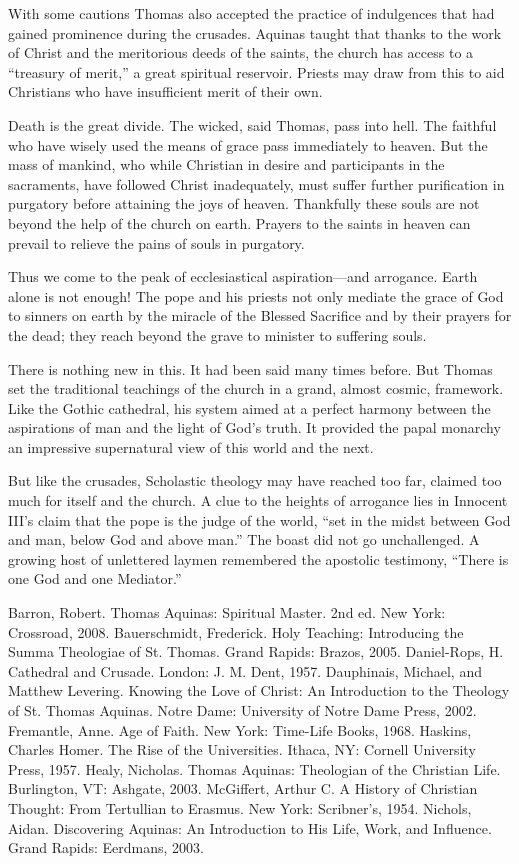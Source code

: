 With some cautions Thomas also accepted the practice of indulgences that had gained prominence
during the crusades. Aquinas taught that thanks to the work of Christ and the meritorious deeds of
the saints, the church has access to a “treasury of merit,” a great spiritual reservoir. Priests may
draw from this to aid Christians who have insufficient merit of their own.

Death is the great divide. The wicked, said Thomas, pass into hell. The faithful who have wisely
used the means of grace pass immediately to heaven. But the mass of mankind, who while Christian in
desire and participants in the sacraments, have followed Christ inadequately, must suffer further
purification in purgatory before attaining the joys of heaven. Thankfully these souls are not beyond
the help of the church on earth. Prayers to the saints in heaven can prevail to relieve the pains of
souls in purgatory.

Thus we come to the peak of ecclesiastical aspiration—and arrogance. Earth alone is not enough! The
pope and his priests not only mediate the grace of God to sinners on earth by the miracle of the
Blessed Sacrifice and by their prayers for the dead; they reach beyond the grave to minister to
suffering souls.

There is nothing new in this. It had been said many times before. But Thomas set the traditional
teachings of the church in a grand, almost cosmic, framework. Like the Gothic cathedral, his system
aimed at a perfect harmony between the aspirations of man and the light of God’s truth. It provided
the papal monarchy an impressive supernatural view of this world and the next.

But like the crusades, Scholastic theology may have reached too far, claimed too much for itself and
the church. A clue to the heights of arrogance lies in Innocent III’s claim that the pope is the
judge of the world, “set in the midst between God and man, below God and above man.” The boast did
not go unchallenged. A growing host of unlettered laymen remembered the apostolic testimony, “There
is one God and one Mediator.”

\begin{readinglist}
\entry *Barron, Robert. Thomas Aquinas: Spiritual Master. 2nd ed. New York: Crossroad, 2008.
\entry *Bauerschmidt, Frederick. Holy Teaching: Introducing the Summa Theologiae of St. Thomas.
  Grand Rapids: Brazos, 2005.
\entry Daniel-Rops, H. Cathedral and Crusade. London: J. M. Dent, 1957.
\entry Dauphinais, Michael, and Matthew Levering. Knowing the Love of Christ: An Introduction to the
  Theology of St. Thomas Aquinas. Notre Dame: University of Notre Dame Press, 2002.
\entry Fremantle, Anne. Age of Faith. New York: Time-Life Books, 1968.
\entry Haskins, Charles Homer. The Rise of the Universities. Ithaca, NY: Cornell University Press,
  1957.
\entry *Healy, Nicholas. Thomas Aquinas: Theologian of the Christian Life. Burlington, VT: Ashgate,
  2003.
\entry McGiffert, Arthur C. A History of Christian Thought: From Tertullian to Erasmus. New York:
  Scribner’s, 1954.
\entry Nichols, Aidan. Discovering Aquinas: An Introduction to His Life, Work, and Influence. Grand
  Rapids: Eerdmans, 2003.
\end{readinglist}

